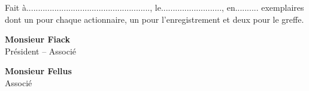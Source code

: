 \documentclass[a4paper,12pt]{report}
\begin{document}
%
%
%
%

\vspace{1cm}

Fait à....................................................., le.........................., en.......... exemplaires dont un pour chaque actionnaire, un pour l'enregistrement et deux pour le greffe.

\vspace{2cm}

\begin{minipage}{0.45\linewidth}
	\center
	\textbf{Monsieur Fiack}\\
	Président -- Associé
\end{minipage}
\begin{minipage}{0.45\linewidth}
	\center
	\textbf{Monsieur Fellus}\\
	Associé
\end{minipage}

\end{document}
